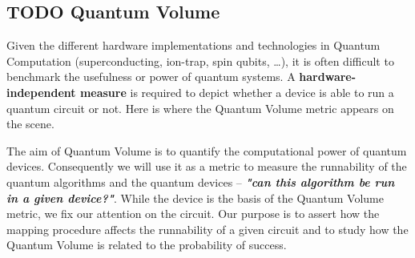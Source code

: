 \subsection*{{\bfseries\sffamily TODO} Quantum Volume}
\label{sec:org4f0be1a}

Given the different hardware implementations and technologies in Quantum Computation (superconducting, ion-trap, spin qubits, \ldots{}), it is often difficult to benchmark the usefulness or power of quantum systems. 
A \textbf{hardware-independent measure} is required to depict whether a device is able to run a quantum circuit or not.
Here is where the Quantum Volume metric appears on the scene.

The aim of Quantum Volume is to quantify the computational power of quantum devices. 
Consequently we will use it as a metric to measure the runnability of the quantum algorithms and the quantum devices -- \emph{\textbf{"can this algorithm be run in a given device?"}}.
While the device is the basis of the Quantum Volume metric, we fix our attention on the circuit.
Our purpose is to assert how the mapping procedure affects the runnability of a given circuit and to study how the Quantum Volume is related to the probability of success.

